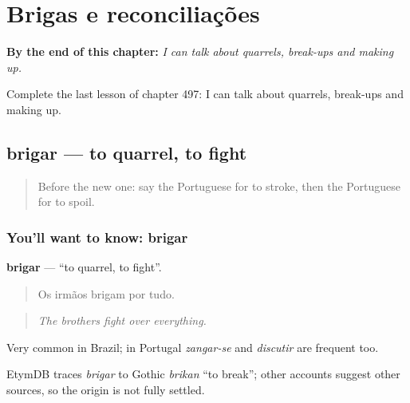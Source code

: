 
\chapter{Brigas e reconciliações}
\label{ch:pt-brigas-e-reconciliacoes}

\begin{chapteropening}
\textbf{By the end of this chapter:} \emph{I can talk about quarrels, break-ups and making up.}

Complete the last lesson of chapter 497: I can talk about quarrels, break-ups and making up.
\end{chapteropening}

\section[brigar]{brigar — to quarrel, to fight}

\label{lesson:PT-C497-brigar}



\begin{quote}
Before the new one: say the Portuguese for to stroke, then the Portuguese for to spoil.
\end{quote}

\subsection*{You'll want to know: brigar}
\textbf{brigar} — \textquotedblleft{}to quarrel, to fight\textquotedblright{}.

\begin{quote}
Os irmãos brigam por tudo.
\end{quote}

\begin{quote}
\emph{The brothers fight over everything.}
\end{quote}

Very common in Brazil; in Portugal \emph{zangar-se} and \emph{discutir} are frequent too.

\begin{cousinweb}
EtymDB traces \emph{brigar} to Gothic \emph{brikan} \textquotedblleft{}to break\textquotedblright{}; other accounts suggest other sources, so the origin is not fully settled.
\end{cousinweb}


